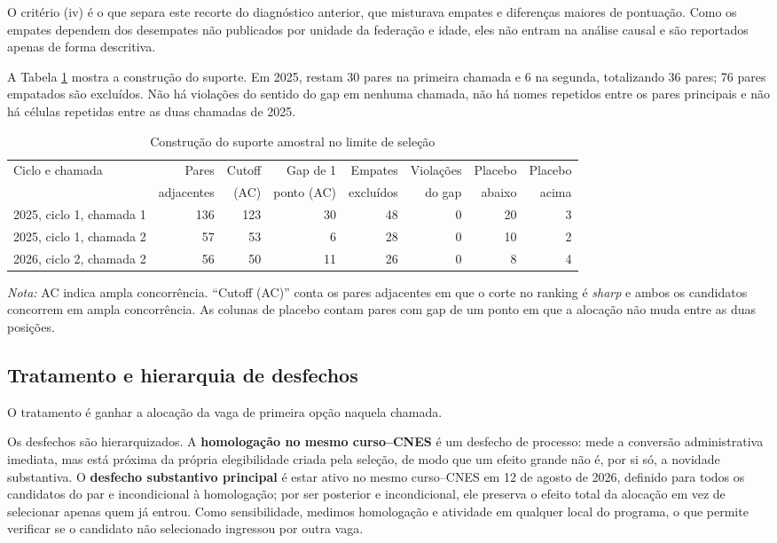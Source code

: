 \documentclass[11pt,a4paper]{article}
\begin{document}
O critério (iv) é o que separa este recorte do diagnóstico anterior, que
misturava empates e diferenças maiores de pontuação. Como os empates dependem
dos desempates não publicados por unidade da federação e idade, eles não entram
na análise causal e são reportados apenas de forma descritiva.

A Tabela \ref{tab:suporte} mostra a construção do suporte. Em 2025, restam 30
pares na primeira chamada e 6 na segunda, totalizando 36 pares; 76 pares
empatados são excluídos. Não há violações do sentido do gap em nenhuma chamada,
não há nomes repetidos entre os pares principais e não há células repetidas entre
as duas chamadas de 2025.

\begin{table}[htbp]
\centering
\footnotesize
\caption{Construção do suporte amostral no limite de seleção}
\label{tab:suporte}
\begin{tabular}{lrrrrrrr}
\toprule
Ciclo e chamada & Pares & Cutoff & Gap de 1 & Empates & Violações & Placebo & Placebo \\
 & adjacentes & (AC) & ponto (AC) & excluídos & do gap & abaixo & acima \\
\midrule
2025, ciclo 1, chamada 1 & 136 & 123 & 30 & 48 & 0 & 20 & 3 \\
2025, ciclo 1, chamada 2 & 57 & 53 & 6 & 28 & 0 & 10 & 2 \\
2026, ciclo 2, chamada 2 & 56 & 50 & 11 & 26 & 0 & 8 & 4 \\
\bottomrule
\end{tabular}

\vspace{2pt}
\begin{minipage}{0.94\textwidth}
\footnotesize \textit{Nota:} AC indica ampla concorrência. ``Cutoff (AC)'' conta
os pares adjacentes em que o corte no ranking é \emph{sharp} e ambos os
candidatos concorrem em ampla concorrência. As colunas de placebo contam pares
com gap de um ponto em que a alocação não muda entre as duas posições.
\end{minipage}
\end{table}

\subsection{Tratamento e hierarquia de desfechos}

O tratamento é ganhar a alocação da vaga de primeira opção naquela chamada.

Os desfechos são hierarquizados. A \textbf{homologação no mesmo curso--CNES} é
um desfecho de processo: mede a conversão administrativa imediata, mas está
próxima da própria elegibilidade criada pela seleção, de modo que um efeito
grande não é, por si só, a novidade substantiva. O \textbf{desfecho substantivo
principal} é estar ativo no mesmo curso--CNES em 12 de agosto de 2026, definido
para todos os candidatos do par e incondicional à homologação; por ser posterior
e incondicional, ele preserva o efeito total da alocação em vez de selecionar
apenas quem já entrou. Como sensibilidade, medimos homologação e atividade em
qualquer local do programa, o que permite verificar se o candidato não
selecionado ingressou por outra vaga.
\end{document}
